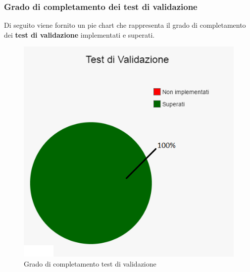 	\subsubsection{Grado di completamento dei test di validazione}
	Di seguito viene fornito un pie chart che rappresenta il grado di completamento dei \textbf{test di validazione} implementati e superati.
	\begin{figure}[H]
		\centering
		\includegraphics[scale=0.7]{includes/img/test_validazione.png}
		\caption{Grado di completamento test di validazione}
	\end{figure}
	
	\clearpage
	
